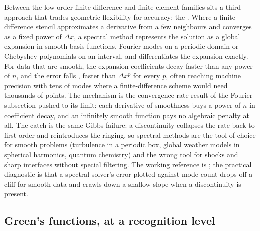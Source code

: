 \begin{mastery}
Between the low-order finite-difference and finite-element families
sits a third approach that trades geometric flexibility for accuracy:
the . Where a finite-difference stencil
approximates a derivative from a few neighbours and converges as a
fixed power of $\Delta x$, a spectral method represents the solution
as a global expansion in smooth basis functions, Fourier modes on a
periodic domain or Chebyshev polynomials on an interval, and
differentiates the expansion exactly. For data that are smooth, the
expansion coefficients decay faster than any power of $n$, and the
error falls , faster than $\Delta x^{p}$ for
every $p$, often reaching machine precision with tens of modes where
a finite-difference scheme would need thousands of points. The
mechanism is the convergence-rate result of the Fourier subsection
pushed to its limit: each derivative of smoothness buys a power of
$n$ in coefficient decay, and an infinitely smooth function pays no
algebraic penalty at all. The catch is the same Gibbs failure: a
discontinuity collapses the rate back to first order and reintroduces
the ringing, so spectral methods are the tool of choice for smooth
problems (turbulence in a periodic box, global weather models in
spherical harmonics, quantum chemistry) and the wrong tool for
shocks and sharp interfaces without special filtering. The working
reference is \textcite{text:v2ch06-trefethen-spectral}; the
practical diagnostic is that a spectral solver's error plotted
against mode count drops off a cliff for smooth data and crawls down
a shallow slope when a discontinuity is present.
\end{mastery}

\subsection{Green's functions, at a recognition level}

